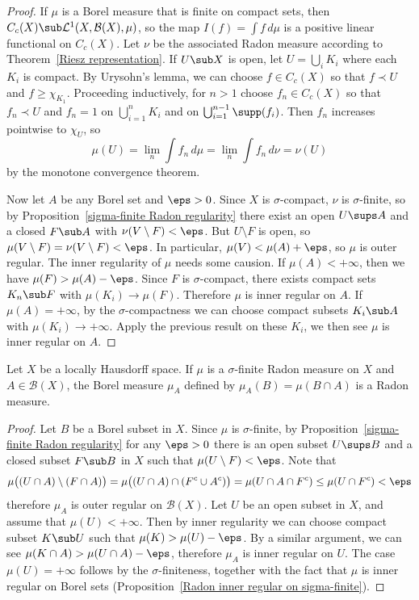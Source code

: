 \begin{proof}
If $\mu$ is a Borel measure that is finite on compact sets, then $C_c(X)\sub\mathcal{L}^1(X,\mathcal{B}(X),\mu)$, so the map $I(f)=\int f\,d\mu$ is a positive linear functional on $C_c(X)$. Let $\nu$ be the associated Radon measure according to Theorem~\ref{Riesz representation}. If $U\sub X$ is open, let $U=\bigcup_iK_i$ where each $K_i$ is compact. By Urysohn's lemma, we can choose $f\in C_c(X)$ so that $f\prec U$ and $f\geq\chi_{K_1}$. Proceeding inductively, for $n>1$ choose $f_n\in C_c(X)$ so that $f_n\prec U$ and $f_n=1$ on $\bigcup_{i=1}^{n}K_i$ and on $\bigcup_{i=1}^{n-1}\supp(f_i)$. Then $f_n$ increases pointwise to $\chi_U$, so 
\[\mu(U)=\lim_n\int f_n\,d\mu=\lim_n\int f_n\,d\nu=\nu(U)\]
by the monotone convergence theorem.\par
Now let $A$ be any Borel set and $\eps>0$. Since $X$ is $\sigma$-compact, $\nu$ is $\sigma$-finite, so by Proposition~\ref{sigma-finite Radon regularity} there exist an open $U\sups A$ and a closed $F\sub A$ with $\nu(V\setminus F)<\eps$. But $U\setminus F$ is open, so $\mu(V\setminus F)=\nu(V\setminus F)<\eps$. In particular, $\mu(V)<\mu(A)+\eps$, so $\mu$ is outer regular. The inner regularity of $\mu$ needs some causion. If $\mu(A)<+\infty$, then we have $\mu(F)>\mu(A)-\eps$. Since $F$ is $\sigma$-compact, there exists compact sets $K_n\sub F$ with $\mu(K_i)\to\mu(F)$. Therefore $\mu$ is inner regular on $A$. If $\mu(A)=+\infty$, by the $\sigma$-compactness we can choose compact subsets $K_i\sub A$ with $\mu(K_i)\to+\infty$. Apply the previous result on these $K_i$, we then see $\mu$ is inner regular on $A$.
\end{proof}
\begin{proposition}
Let $X$ be a locally Hausdorff space. If $\mu$ is a $\sigma$-finite Radon measure on $X$ and $A\in\mathcal{B}(X)$, the Borel measure $\mu_A$ defined by $\mu_A(B)=\mu(B\cap A)$ is a Radon measure.
\end{proposition}
\begin{proof}
Let $B$ be a Borel subset in $X$. Since $\mu$ is $\sigma$-finite, by Proposition~\ref{sigma-finite Radon regularity} for any $\eps>0$ there is an open subset $U\sups B$ and a closed subset $F\sub B$ in $X$ such that $\mu(U\setminus F)<\eps$. Note that
\[\mu\big((U\cap A)\setminus(F\cap A)\big)=\mu\big((U\cap A)\cap(F^c\cup A^c)\big)=\mu(U\cap A\cap F^c)\leq\mu(U\cap F^c)<\eps\]
therefore $\mu_A$ is outer regular on $\mathcal{B}(X)$. Let $U$ be an open subset in $X$, and assume that $\mu(U)<+\infty$. Then by inner regularity we can choose compact subset $K\sub U$ such that $\mu(K)>\mu(U)-\eps$. By a similar argument, we can see $\mu(K\cap A)>\mu(U\cap A)-\eps$, therefore $\mu_A$ is inner regular on $U$. The case $\mu(U)=+\infty$ follows by the $\sigma$-finiteness, together with the fact that $\mu$ is inner regular on Borel sets (Proposition~\ref{Radon inner regular on sigma-finite}).
\end{proof}
